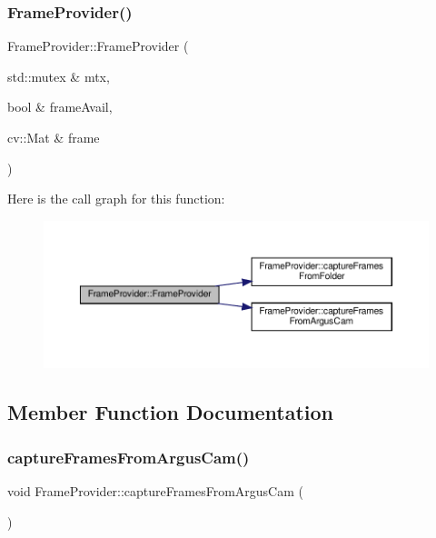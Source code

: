 \subsubsection{\texorpdfstring{Frame\+Provider()}{FrameProvider()}}
{\footnotesize\ttfamily Frame\+Provider\+::\+Frame\+Provider (\begin{DoxyParamCaption}\item[{std\+::mutex \&}]{mtx,  }\item[{bool \&}]{frame\+Avail,  }\item[{cv\+::\+Mat \&}]{frame }\end{DoxyParamCaption})\hspace{0.3cm}{\ttfamily [inline]}}

Here is the call graph for this function\+:\nopagebreak
\begin{figure}[H]
\begin{center}
\leavevmode
\includegraphics[width=350pt]{classFrameProvider_a03f142a7ea5878a32fec67f2b85f22fd_cgraph}
\end{center}
\end{figure}


\subsection{Member Function Documentation}
\mbox{\label{classFrameProvider_a15097906b20d2d564b9bfea82c2f956c}} 
\subsubsection{\texorpdfstring{capture\+Frames\+From\+Argus\+Cam()}{captureFramesFromArgusCam()}}
{\footnotesize\ttfamily void Frame\+Provider\+::capture\+Frames\+From\+Argus\+Cam (\begin{DoxyParamCaption}{ }\end{DoxyParamCaption})}

